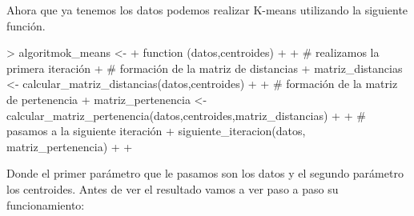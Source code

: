 \documentclass[parskip=full]{scrartcl}
\begin{document}
Ahora que ya tenemos los datos podemos realizar K-means utilizando la siguiente función.


\begin{Schunk}
\begin{Sinput}
> algoritmok_means <- 
+ function (datos,centroides){
+ 
+ # realizamos la primera iteración
+ # formación de la matriz de distancias
+ matriz_distancias <- calcular_matriz_distancias(datos,centroides)
+ 
+ # formación de la matriz de pertenencia
+ matriz_pertenencia <- calcular_matriz_pertenencia(datos,centroides,matriz_distancias)
+ 
+ # pasamos a la siguiente iteración
+ siguiente_iteracion(datos, matriz_pertenencia)
+ 
+ }
\end{Sinput}
\end{Schunk}


Donde el primer parámetro que le pasamos son los datos y el segundo parámetro los centroides. Antes de ver el resultado vamos a ver paso a paso su funcionamiento:
\end{document}
